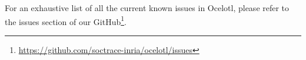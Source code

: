 \documentclass[twoside]{article}
\begin{document}
\begin{sloppypar}
For an exhaustive list of all the current known issues in Ocelotl, please refer to the issues section of our GitHub\footnote{\url{https://github.com/soctrace-inria/ocelotl/issues}}.

\newpage

\newpage



\end{sloppypar} 
\end{document}
